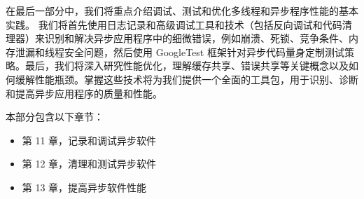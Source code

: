 在最后一部分中，我们将重点介绍调试、测试和优化多线程和异步程序性能的基本实践。
我们将首先使用日志记录和高级调试工具和技术（包括反向调试和代码清理器）来识别和解决异步应用程序中的细微错误，例如崩溃、死锁、竞争条件、内存泄漏和线程安全问题，然后使用 GoogleTest 框架针对异步代码量身定制测试策略。最后，我们将深入研究性能优化，理解缓存共享、错误共享等关键概念以及如何缓解性能瓶颈。掌握这些技术将为我们提供一个全面的工具包，用于识别、诊断和提高异步应用程序的质量和性能。

本部分包含以下章节：

\begin{itemize}
\item
第 11 章，记录和调试异步软件

\item
第 12 章，清理和测试异步软件

\item
第 13 章，提高异步软件性能
\end{itemize}
